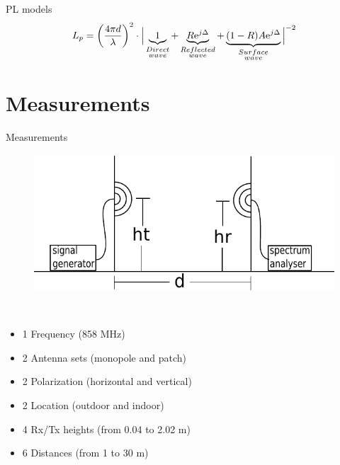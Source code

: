 \documentclass[10pt]{beamer}
\begin{document}
\begin{frame}{PL models}
\vspace{1em}
\begin{equation}
L_p=\left(\frac{4 \pi d}{\lambda}\right)^2 \cdot \Big|\underbrace{1}_{\begin{subarray}{c}Direct\\wave\end{subarray}}+\underbrace{R\text{e}^{j\Delta}}_{\begin{subarray}{c}Reflected\\wave\end{subarray}}+\underbrace{(1-R)A\text{e}^{j\Delta}}_{\begin{subarray}{c}Surface\\wave\end{subarray}}\Big|^{-2} 
\label{ground_wave}
\end{equation}
\end{frame}


\section{Measurements}
\begin{frame}{Measurements}
\begin{figure}[!htbp]
	\centering
	\includegraphics[width = \columnwidth]{figures/setup.pdf}
\end{figure}
\begin{minipage}{0.15\textwidth}
 \textcolor{white}{.}  
\end{minipage}%
\begin{minipage}{0.8\textwidth}
\begin{itemize}
\item 1 Frequency (858 MHz)
\item 2 Antenna sets (monopole and patch)
\item 2 Polarization (horizontal and vertical)
\item 2 Location (outdoor and indoor)
\item 4 Rx/Tx heights (from 0.04 to 2.02 m)
\item 6 Distances (from 1 to 30 m)
\end{itemize}
\end{minipage}
\end{frame}
\end{document}
